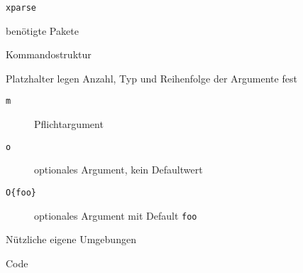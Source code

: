 \begin{frame}[fragile]{\texttt{xparse}}
  \begin{block}{benötigte Pakete}
    \begin{lstverbatim}
    \usepackage{xparse}
    \end{lstverbatim}
  \end{block}
  \begin{block}{Kommandostruktur}
  \end{block}
  Platzhalter legen Anzahl, Typ und Reihenfolge der Argumente fest 
  \begin{description}
    \item[\texttt{m}] Pflichtargument
    \item[\texttt{o}] optionales Argument, kein Defaultwert
    \item[\texttt{O\{foo\}}] optionales Argument mit Default \texttt{foo}
  \end{description}
\end{frame}

\begin{frame}[fragile]{Nützliche eigene Umgebungen}
  \begin{block}{Code}
    \begin{lstverbatim}
    {
      \begin{IEEEeqnarray}{#1}
    }
    {
      \end{IEEEeqnarray}
      \ignorespacesafterend %
    }
    {
      \begin{eqns}[c]
    }
    {
      \end{eqns}
      \ignorespacesafterend
    }
    \end{lstverbatim}
  \end{block}
\end{frame}

